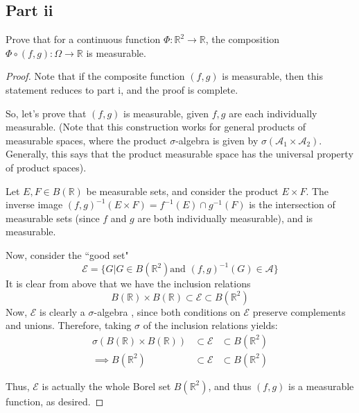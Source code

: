 \documentclass[paper=a4, fontsize=11pt]{scrartcl} %
\numberwithin{equation}{section} %
\numberwithin{figure}{section} %
\numberwithin{table}{section} %
\newcommand{\sigalg}{$\sigma$-algebra }
\begin{document}
\subsection*{Part ii}
Prove that for a continuous function $\Phi:\mathbb{R}^2 \to \mathbb{R}$,
the composition $\Phi\circ(f,g):\Omega\to \mathbb{R}$ is measurable.
\\
\begin{proof}
Note that if the composite function $(f,g)$ is measurable, then this statement reduces to
part i, and the proof is complete.

So, let's prove that $(f,g)$ is measurable, given $f,g$ are each individually measurable.
(Note that this construction works for general products of measurable spaces, where the product
\sigalg is given by $\sigma(\mathscr{A}_1\times\mathscr{A}_2)$. Generally, this says that
the product measurable space has the universal property of product spaces).

Let $E,F\in B(\mathbb{R})$ be measurable sets, and consider the product $E\times F$. The
inverse image $(f,g)^{-1}(E\times F) = f^{-1}(E)\cap g^{-1}(F)$ is the intersection of measurable
sets (since $f$ and $g$ are both individually measurable), and is measurable.

Now, consider the ``good set"
\[
\mathscr{E} = \{G | G\in B(\mathbb{R}^2) \textrm{and } (f,g)^{-1}(G) \in \mathscr{A}\}
\]
It is clear from above that we have the inclusion relations
\[
B(\mathbb{R})\times B(\mathbb{R}) \subset \mathscr{E} \subset B(\mathbb{R}^2)
\]
Now, $\mathscr{E}$ is clearly a \sigalg, since both conditions on $\mathscr{E}$ preserve
complements and unions. Therefore, taking $\sigma$ of the inclusion relations yields:
\[
\begin{aligned}
\sigma(B(\mathbb{R})\times B(\mathbb{R})) &\subset \mathscr{E} &\subset B(\mathbb{R}^2)\\
\implies B(\mathbb{R}^2) &\subset \mathscr{E} &\subset B(\mathbb{R}^2)
\end{aligned}
\]

Thus, $\mathscr{E}$ is actually the whole Borel set $B(\mathbb{R}^2)$, and thus
$(f,g)$ is a measurable function, as desired.
\end{proof}
\end{document}
